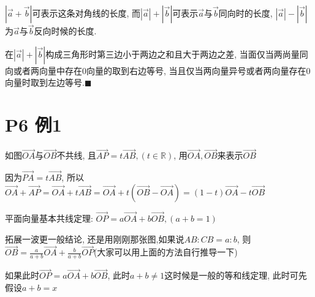 \documentclass{book}
\begin{document}
    $\displaystyle |\overrightarrow{a}+\overrightarrow{b}|$可表示这条对角线的长度, 而$|\overrightarrow{a}|+|\overrightarrow{b}|$可表示$\overrightarrow{a}$与$\overrightarrow{b}$同向时的长度, $|\overrightarrow{a}|-|\overrightarrow{b}|$为$\overrightarrow{a}$与$\overrightarrow{b}$反向时候的长度.

    在$|\overrightarrow{a}|+|\overrightarrow{b}|$构成三角形时\textcolor[rgb]{0.75,0.17,0.22}{第三边小于两边之和且大于两边之差}, 当面仅当两尚量同向或者两向量中存在0向量的取到右边等号, 当且仅当两向量异号或者两向量存在0向量时取到左边等号.$\blacksquare$

    \section{\textcolor[rgb]{0.11,0.65,0.52}{P6 例1}}

    如图$\overrightarrow{OA}$与$\overrightarrow{OB}$不共线, 且$\overrightarrow{AP}=t\overrightarrow{AB}, (t\in \mathbb{R})$, 用$\overrightarrow{OA},\overrightarrow{OB}$来表示$\overrightarrow{OB}$

    因为$\overrightarrow{PA}=t\overrightarrow{AB}$, 所以$\overrightarrow{OA}+\overrightarrow{AP}=\overrightarrow{OA}+t\overrightarrow{AB}=\overrightarrow{OA}+t(\overrightarrow{OB}-\overrightarrow{OA})=(1-t)\overrightarrow{OA}-t\overrightarrow{OB}$

    \textcolor[rgb]{0.38,0.11,0.2}{平面向量基本共线定理}: $\overrightarrow{OP}=a\overrightarrow{OA}+b\overrightarrow{OB},(a+b=1)$

    拓展一波更一般结论, 还是用刚刚那张图,如果说$AB:CB=a:b$, 则$\displaystyle \overrightarrow{OB}=\frac{a}{a+b}\overrightarrow{OA}+\frac{b}{a+b}\overrightarrow{OP}$(大家可以用上面的方法自行推导一下)

    如果此时$\overrightarrow{OP}=a\overrightarrow{OA}+b\overrightarrow{OB}$, 此时$a+b\neq 1$这时候是一般的\textcolor[rgb]{0.38,0.11,0.2}{等和线定理}, 此时可先假设$a+b=x$
\end{document}
